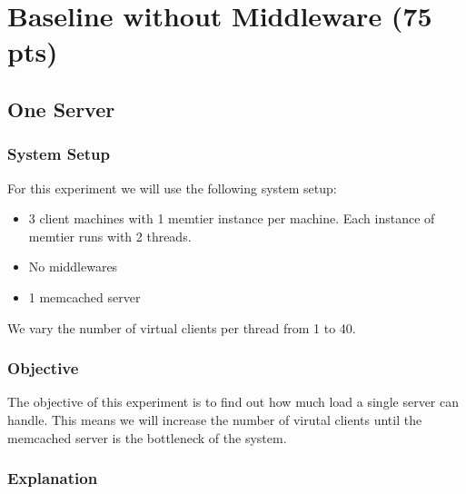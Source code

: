 \documentclass[11pt,a4paper]{article}
\begin{document}
\section{Baseline without Middleware (75 pts)}
%
\subsection{One Server}
%
\subsubsection{System Setup}
%
For this experiment we will use the following system setup:
%
\begin{itemize}
	\item 3 client machines with 1 memtier instance per machine. Each instance of memtier runs with 2 threads.
	\item No middlewares
	\item 1 memcached server
\end{itemize}
%
We vary the number of virtual clients per thread from 1 to 40.
%
\subsubsection{Objective}
%
The objective of this experiment is to find out how much load a single server can handle.
%
This means we will increase the number of virutal clients until the memcached server is the bottleneck of the system.
%
\subsubsection{Explanation}
%
\end{document}
